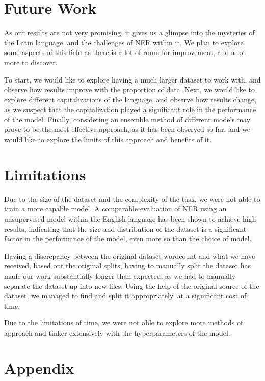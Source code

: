 \documentclass[11pt]{article}
\begin{document}
\section{Future Work}

As our results are not very promising, it gives us a glimpse into the mysteries of the Latin language, and the challenges of NER within it.
We plan to explore some aspects of this field as there is a lot of room for improvement, and a lot more to discover.

To start, we would like to explore having a much larger dataset to work with, and observe how results improve with the proportion of data.
Next, we would like to explore different capitalizations of the language, and observe how results change, as we
suspect that the capitalization played a significant role in the performance of the model.
Finally, considering an ensemble method of different models may prove to be the most effective approach, as it has been observed so far,
and we would like to explore the limits of this approach and benefits of it.

\newpage
\section*{Limitations}

Due to the size of the dataset and the complexity of the task, we were not able to train a more capable model.
A comparable evaluation of NER using an unsupervised model within the English language has been shown to achieve high results,
indicating that the size and distribution of the dataset is a significant factor in the performance of the model, even more so than the choice of model.

Having a discrepancy between the original dataset wordcount and what we have received, based ont the original splits, having to
manually split the dataset has made our work substantially longer than expected, as we had to manually separate the dataset up into
new files. Using the help of the original source of the dataset, we managed to find and split it appropriately, at a significant cost of time.

Due to the limitations of time, we were not able to explore more methods of approach and tinker extensively with the hyperparameters of the model.

\appendix

\section{Appendix}
\label{sec:appendix}
\end{document}
